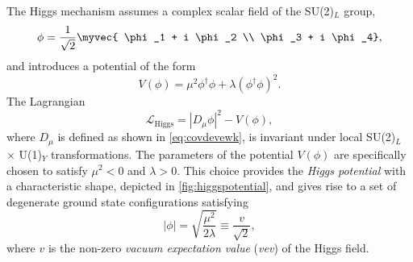 
The Higgs mechanism assumes a complex scalar field of the SU(2)$_L$ group,
\begin{equation}
  \phi = \frac{1}{\sqrt{2}} \myvec { \phi_1 + i \phi_2 \\ \phi_3 + i \phi_4},
\end{equation}
and introduces a potential of the form
\begin{equation}
  V(\phi) = \mu^2\phi^\dagger\phi + \lambda \left(\phi^\dagger\phi \right)^2.
  \label{eq:higgspotential}
\end{equation}
The Lagrangian 
\begin{equation}
  \mathcal{L}_{\text{Higgs}} = |D_\mu\phi|^2 - V(\phi), %
  \label{eq:lagrangianhiggs}
\end{equation}
where $D_\mu$ is defined as shown in \cref{eq:covdevewk}, is invariant under local SU(2)$_L$ $\times$ U(1)$_Y$ transformations.
The parameters of the potential $V(\phi)$ are specifically chosen to satisfy $\mu^2 < 0$ and $\lambda > 0$.
This choice provides the \emph{Higgs potential} with a characteristic shape, depicted in \cref{fig:higgspotential}, and gives rise to a set of degenerate ground state configurations satisfying
\begin{equation}
  |\phi| = \sqrt{ \frac{\mu^2}{2\lambda} } \equiv \frac{ v }{\sqrt{2}},
  \label{eq:higgsminima}
\end{equation}
where $v$ is the non-zero \emph{vacuum expectation value} (\emph{vev}) of the Higgs field.
